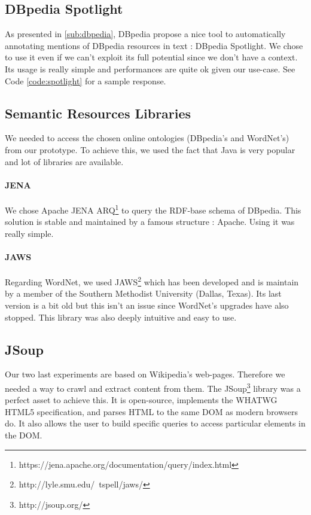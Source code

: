 \subsection{DBpedia Spotlight} %
\label{sub:dbpedia_spotlight}
As presented in \ref{sub:dbpedia}, DBpedia propose a nice tool to automatically annotating mentions of DBpedia resources in text : DBpedia Spotlight. We chose to use it even if we can't exploit its full potential since we don't have a context. Its usage is really simple and performances are quite ok given our use-case. See Code \ref{code:spotlight} for a sample response.

\subsection{Semantic Resources Libraries} %
\label{sub:semantic_resources_libraries}
We needed to access the chosen online ontologies (DBpedia's and WordNet's) from our prototype. To achieve this, we used the fact that Java is very popular and lot of libraries are available.
\paragraph{JENA} %
\label{par:jena}
We chose Apache JENA ARQ\footnote{https://jena.apache.org/documentation/query/index.html} to query the RDF-base schema of DBpedia. This solution is stable and maintained by a famous structure : Apache. Using it was really simple.
\paragraph{JAWS} %
\label{par:jaws}
Regarding WordNet, we used JAWS\footnote{http://lyle.smu.edu/~tspell/jaws/} which has been developed and is maintain by a member of the Southern Methodist University (Dallas, Texas). Its last version is a bit old but this isn't an issue since WordNet's upgrades have also stopped. This library was also deeply intuitive and easy to use.
\subsection{JSoup} %
\label{sub:jsoup}
Our two last experiments are based on Wikipedia's web-pages. Therefore we needed a way to crawl and extract content from them. The JSoup\footnote{http://jsoup.org/} library was a perfect asset to achieve this. It is open-source, implements the WHATWG HTML5 specification, and parses HTML to the same DOM as modern browsers do. It also allows the user to build specific queries to access particular elements in the DOM.

